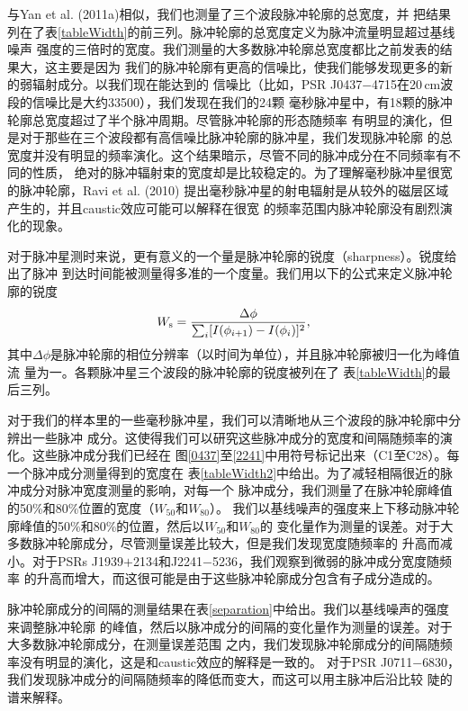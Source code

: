 与Yan et al. (2011a)\supercite{Yan11a}相似，我们也测量了三个波段脉冲轮廓的总宽度，并
把结果列在了表\ref{tableWidth}的前三列。脉冲轮廓的总宽度定义为脉冲流量明显超过基线噪声
强度的三倍时的宽度。我们测量的大多数脉冲轮廓总宽度都比之前发表的结果大，这主要是因为
我们的脉冲轮廓有更高的信噪比，使我们能够发现更多的新的弱辐射成分。以我们现在能达到的
信噪比（比如，PSR J0437$-$4715在20\,cm波段的信噪比是大约33500），我们发现在我们的24颗
毫秒脉冲星中，有18颗的脉冲轮廓总宽度超过了半个脉冲周期。尽管脉冲轮廓的形态随频率
有明显的演化，但是对于那些在三个波段都有高信噪比脉冲轮廓的脉冲星，我们发现脉冲轮廓
的总宽度并没有明显的频率演化。这个结果暗示，尽管不同的脉冲成分在不同频率有不同的性质，
绝对的脉冲辐射束的宽度却是比较稳定的。为了理解毫秒脉冲星很宽的脉冲轮廓，Ravi et al. (2010)\supercite{Ravi10}
提出毫秒脉冲星的射电辐射是从较外的磁层区域产生的，并且caustic效应可能可以解释在很宽
的频率范围内脉冲轮廓没有剧烈演化的现象。

对于脉冲星测时来说，更有意义的一个量是脉冲轮廓的锐度（sharpness）。锐度给出了脉冲
到达时间能被测量得多准的一个度量。我们用以下的公式来定义脉冲轮廓的锐度
%
\begin{equation}
W_{\rm{s}}=\frac{\Delta \phi}{\sum_{i}[I(\phi_{i+1})-I(\phi_{i})]^2},
\end{equation}
%
其中$\Delta \phi$是脉冲轮廓的相位分辨率（以时间为单位），并且脉冲轮廓被归一化为峰值流
量为一\supercite{Cordes10,Shannon14}。各颗脉冲星三个波段的脉冲轮廓的锐度被列在了
表\ref{tableWidth}的最后三列。

对于我们的样本里的一些毫秒脉冲星，我们可以清晰地从三个波段的脉冲轮廓中分辨出一些脉冲
成分。这使得我们可以研究这些脉冲成分的宽度和间隔随频率的演化。这些脉冲成分我们已经在
图\ref{0437}至\ref{2241}中用符号标记出来（C1至C28）。每一个脉冲成分测量得到的宽度在
表\ref{tableWidth2}中给出。为了减轻相隔很近的脉冲成分对脉冲宽度测量的影响，对每一个
脉冲成分，我们测量了在脉冲轮廓峰值的50\%和80\%位置的宽度（$W_{50}$和$W_{80}$）。
我们以基线噪声的强度来上下移动脉冲轮廓峰值的50\%和80\%的位置，然后以$W_{50}$和$W_{80}$的
变化量作为测量的误差。对于大多数脉冲轮廓成分，尽管测量误差比较大，但是我们发现宽度随频率的
升高而减小。对于PSRs J1939$+$2134和J2241$-$5236，我们观察到微弱的脉冲成分宽度随频率
的升高而增大，而这很可能是由于这些脉冲轮廓成分包含有子成分造成的。

脉冲轮廓成分的间隔的测量结果在表\ref{separation}中给出。我们以基线噪声的强度来调整脉冲轮廓
的峰值，然后以脉冲成分的间隔的变化量作为测量的误差。对于大多数脉冲轮廓成分，在测量误差范围
之内，我们发现脉冲轮廓成分的间隔随频率没有明显的演化，这是和caustic效应的解释是一致的。
对于PSR J0711$-$6830，我们发现脉冲成分的间隔随频率的降低而变大，而这可以用主脉冲后沿比较
陡的谱来解释。

